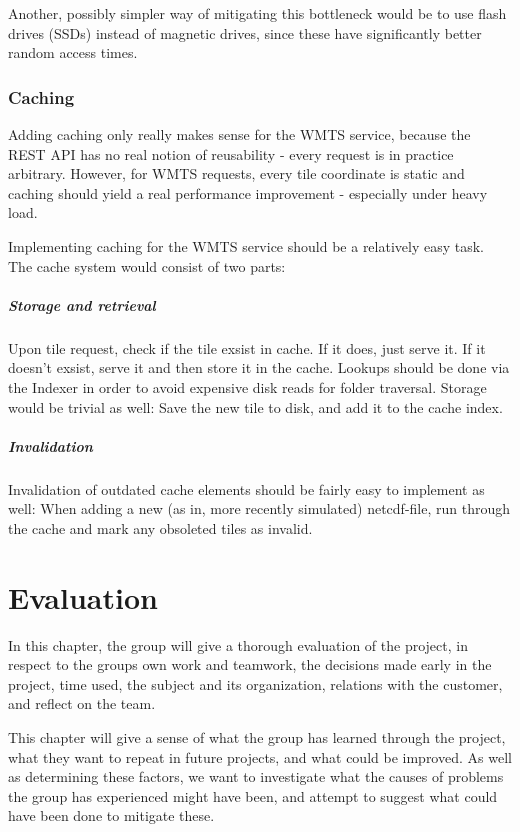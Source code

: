 \documentclass[11pt,a4paper,titlepage,oneside]{report}
\begin{document}
Another, possibly simpler way of mitigating this bottleneck would be to use flash drives (SSDs) instead of magnetic drives, since these have significantly better random access times.

\subsection{Caching}
Adding caching only really makes sense for the WMTS service, because the REST API has no real notion of reusability - every request is in practice arbitrary. However, for WMTS requests, every tile coordinate is static and caching should yield a real performance improvement - especially under heavy load.

Implementing caching for the WMTS service should be a relatively easy task. The cache system would consist of two parts:

\paragraph{Storage and retrieval}
Upon tile request, check if the tile exsist in cache. If it does, just serve it. If it doesn't exsist, serve it and then store it in the cache.
Lookups should be done via the Indexer in order to avoid expensive disk reads for folder traversal.
Storage would be trivial as well: Save the new tile to disk, and add it to the cache index.
\paragraph{Invalidation}
Invalidation of outdated cache elements should be fairly easy to implement as well: When adding a new (as in, more recently simulated) \gls{netcdf}-file, run through the cache and mark any obsoleted tiles as invalid.


\chapter{Evaluation}
In this chapter, the group will give a thorough evaluation of the project, in respect to the groups own work and teamwork, the decisions made early in the project, time used, the subject and its organization, relations with the customer, and reflect on the team. 

This chapter will give a sense of what the group has learned through the project, what they want to repeat in future projects, and what could be improved. As well as determining these factors, we want to investigate what the causes of problems the group has experienced might have been, and attempt to suggest what could have been done to mitigate these. 
\end{document}
